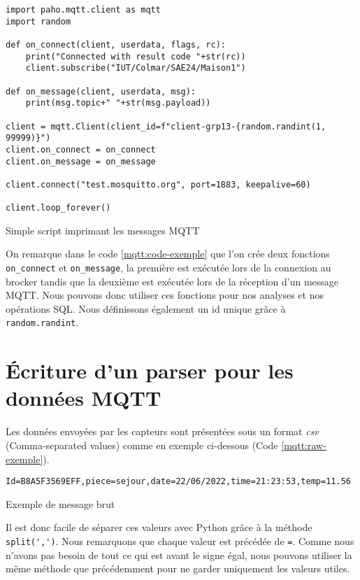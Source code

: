 \documentclass{article}
\begin{document}
    \begin{listing}[H]
        \begin{verbatim}
import paho.mqtt.client as mqtt
import random

def on_connect(client, userdata, flags, rc):
    print("Connected with result code "+str(rc))
    client.subscribe("IUT/Colmar/SAE24/Maison1")

def on_message(client, userdata, msg):
    print(msg.topic+" "+str(msg.payload))

client = mqtt.Client(client_id=f"client-grp13-{random.randint(1, 99999)}")
client.on_connect = on_connect
client.on_message = on_message

client.connect("test.mosquitto.org", port=1883, keepalive=60)

client.loop_forever()
        \end{verbatim}
        \caption{Simple script imprimant les messages MQTT}
        \label{mqtt:code-exemple}
    \end{listing}
    On remarque dans le code \ref{mqtt:code-exemple} que l'on crée deux fonctions \verb|on_connect| et \verb|on_message|, la première est exécutée lors de la connexion au brocker tandis que la deuxième est exécutée lors de la réception d'un message MQTT. 
    Nous pouvons donc utiliser ces fonctions pour nos analyses et nos opérations SQL.
    Nous définissons également un id unique grâce à \verb|random.randint|.

\section{Écriture d'un parser pour les données MQTT}
    Les données envoyées par les capteurs sont présentées sous un format \emph{csv} (Comma-separated values) comme en exemple ci-dessous (Code \ref{mqtt:raw-exemple}). 
    \begin{listing}[H]
        \begin{verbatim}
Id=B8A5F3569EFF,piece=sejour,date=22/06/2022,time=21:23:53,temp=11.56
        \end{verbatim}
        \caption{Exemple de message brut}
        \label{mqtt:raw-exemple}
    \end{listing}
    Il est donc facile de séparer ces valeurs avec Python grâce à la méthode \verb|split(',')|. Nous remarquons que chaque valeur est précédée de \verb|=|. 
    Comme nous n'avons pas besoin de tout ce qui est avant le signe égal, nous pouvons utiliser la même méthode que précédemment pour ne garder uniquement les valeurs utiles.
\end{document}
